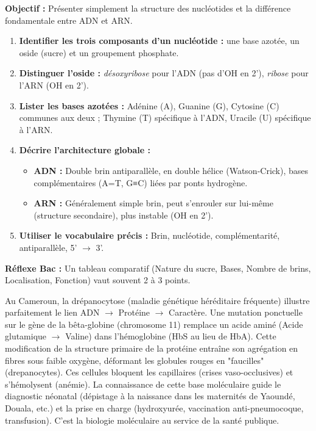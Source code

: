 \documentclass[11pt]{article}
\newcommand{\cle}[1]{{\popxbold\color{popdark}#1}}
\begin{document}
\begin{methode}
    \textbf{Objectif :} Présenter simplement la structure des nucléotides et la différence fondamentale entre \cle{ADN} et \cle{ARN}.
    \begin{enumerate}
        \item \textbf{Identifier les trois composants d'un nucléotide :} une \cle{base azotée}, un \cle{oside} (sucre) et un groupement \cle{phosphate}.
        \item \textbf{Distinguer l'oside :} \emph{désoxyribose} pour l'ADN (pas d'OH en 2'), \emph{ribose} pour l'ARN (OH en 2').
        \item \textbf{Lister les bases azotées :} Adénine (A), Guanine (G), Cytosine (C) communes aux deux ; Thymine (T) spécifique à l'ADN, Uracile (U) spécifique à l'ARN.
        \item \textbf{Décrire l'architecture globale :}
        \begin{itemize}
            \item \textbf{ADN :} Double brin \cle{antiparallèle}, en \cle{double hélice} (Watson-Crick), bases \cle{complémentaires} (A=T, G≡C) liées par \cle{ponts hydrogène}.
            \item \textbf{ARN :} Généralement \cle{simple brin}, peut s'enrouler sur lui-même (structure secondaire), plus instable (OH en 2').
        \end{itemize}
        \item \textbf{Utiliser le vocabulaire précis :} Brin, nucléotide, complémentarité, antiparallèle, 5' $\rightarrow$ 3'.
    \end{enumerate}
    \textbf{Réflexe Bac :} Un tableau comparatif (Nature du sucre, Bases, Nombre de brins, Localisation, Fonction) vaut souvent 2 à 3 points.
\end{methode}

\begin{savaistu}
    Au Cameroun, la \cle{drépanocytose} (maladie génétique héréditaire fréquente) illustre parfaitement le lien ADN $\rightarrow$ Protéine $\rightarrow$ Caractère. Une mutation ponctuelle sur le gène de la \cle{bêta-globine} (chromosome 11) remplace un acide aminé (Acide glutamique $\rightarrow$ Valine) dans l'hémoglobine (HbS au lieu de HbA). Cette modification de la \cle{structure primaire} de la protéine entraîne son agrégation en fibres sous faible oxygène, déformant les globules rouges en "faucilles" (drepanocytes). Ces cellules bloquent les capillaires (crises vaso-occlusives) et s'hémolysent (anémie). La connaissance de cette base moléculaire guide le diagnostic néonatal (dépistage à la naissance dans les maternités de Yaoundé, Douala, etc.) et la prise en charge (hydroxyurée, vaccination anti-pneumocoque, transfusion). C'est la biologie moléculaire au service de la santé publique.
\end{savaistu}
\end{document}
